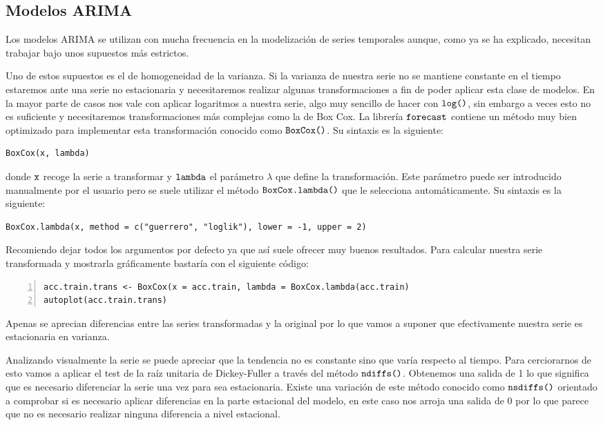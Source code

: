 \subsection{Modelos ARIMA}
Los modelos ARIMA se utilizan con mucha frecuencia en la modelización de series temporales aunque, como ya se ha explicado, necesitan trabajar bajo unos supuestos más estrictos.

Uno de estos supuestos es el de homogeneidad de la varianza. Si la varianza de nuestra serie no se mantiene constante en el tiempo estaremos ante una serie no estacionaria y necesitaremos realizar algunas transformaciones a fin de poder aplicar esta clase de modelos. En la mayor parte de casos nos vale con aplicar logaritmos a nuestra serie, algo muy sencillo de hacer con $\verb!log()!$, sin embargo a veces esto no es suficiente y necesitaremos transformaciones más complejas como la de Box Cox. La librería $\verb!forecast!$ contiene un método muy bien optimizado para implementar esta transformación conocido como $\verb!BoxCox()!$. Su sintaxis es la siguiente:
\begin{Verbatim}[fontsize=\footnotesize]
BoxCox(x, lambda)
\end{Verbatim}

\noindent donde $\verb!x!$ recoge la serie a transformar y $\verb!lambda!$ el parámetro $\lambda$ que define la transformación. Este parámetro puede ser introducido manualmente por el usuario pero se suele utilizar el método $\verb!BoxCox.lambda()!$ que le selecciona automáticamente. Su sintaxis es la siguiente:
\begin{Verbatim}[fontsize=\footnotesize]
BoxCox.lambda(x, method = c("guerrero", "loglik"), lower = -1, upper = 2)
\end{Verbatim}

Recomiendo dejar todos los argumentos por defecto ya que así suele ofrecer muy buenos resultados. Para calcular nuestra serie transformada y mostrarla gráficamente bastaría con el siguiente código:
\begin{Verbatim}[fontsize=\footnotesize, numbers = left]
acc.train.trans <- BoxCox(x = acc.train, lambda = BoxCox.lambda(acc.train)
autoplot(acc.train.trans)
\end{Verbatim}

Apenas se aprecian diferencias entre las series transformadas y la original por lo que vamos a suponer que efectivamente nuestra serie es estacionaria en varianza.

Analizando visualmente la serie se puede apreciar que la tendencia no es constante sino que varía respecto al tiempo. Para cerciorarnos de esto vamos a aplicar el test de la raíz unitaria de Dickey-Fuller a través del método $\verb!ndiffs()!$. Obtenemos una salida de 1 lo que significa que es necesario diferenciar la serie una vez para sea estacionaria. Existe una variación de este método conocido como $\verb!nsdiffs()!$ orientado a comprobar si es necesario aplicar diferencias en la parte estacional del modelo, en este caso nos arroja una salida de 0 por lo que parece que no es necesario realizar ninguna diferencia a nivel estacional.

